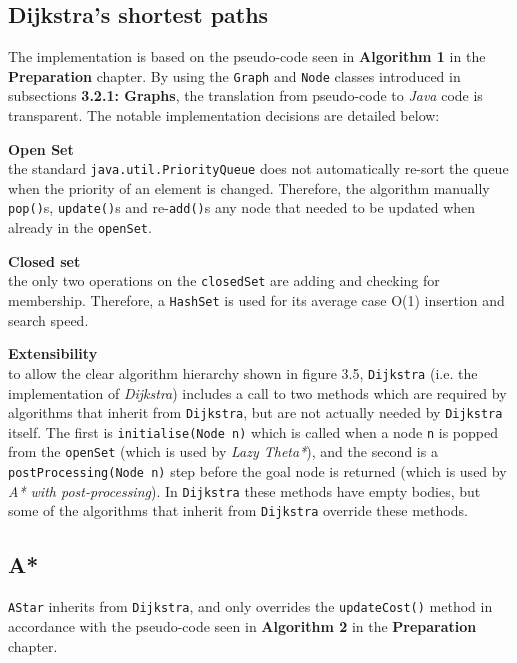 \documentclass[12pt,notitlepage]{report}
\begin{document}
\subsection{Dijkstra's shortest paths}
The implementation is based on the pseudo-code seen in {\bfseries Algorithm 1} in the {\bfseries Preparation} chapter. By using the {\tt Graph} and {\tt Node} classes introduced in subsections {\bfseries 3.2.1: Graphs}, the translation from pseudo-code to {\em Java} code is transparent. The notable implementation decisions are detailed below:
\begin{description}
  \item {\bf Open Set}\\ \hfill
  the standard {\tt java.util.PriorityQueue} does not automatically re-sort the queue when the priority of an element is changed. Therefore, the algorithm manually {\tt pop()}s, {\tt update()}s and re-{\tt add()}s any node that needed to be updated when already in the {\tt openSet}.
  \item {\bf Closed set}\\ \hfill
  the only two operations on the {\tt closedSet} are adding and checking for membership. Therefore, a {\tt HashSet} is used for its average case O(1) insertion and search speed.
  \item {\bf Extensibility} \\ \hfill
  to allow the clear algorithm hierarchy shown in figure 3.5, {\tt Dijkstra} (i.e. the implementation of {\em Dijkstra}) includes a call to two methods which are required by algorithms that inherit from {\tt Dijkstra}, but are not actually needed by {\tt Dijkstra} itself. The first is {\tt initialise(Node n)} which is called when a node {\tt n} is popped from the {\tt openSet} (which is used by {\em Lazy Theta*}), and the second is a {\tt postProcessing(Node n)} step before the goal node is returned (which is used by {\em A* with post-processing}). In {\tt Dijkstra}  these methods have empty bodies, but some of the algorithms that inherit from {\tt Dijkstra} override these methods.
  \end{description}

\subsection{A*}
{\tt AStar} inherits from {\tt Dijkstra}, and only overrides the {\tt updateCost()} method in accordance with the pseudo-code seen in {\bfseries Algorithm 2} in the {\bfseries Preparation} chapter. 
\end{document}
